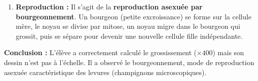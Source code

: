 \documentclass[11pt]{article}
\begin{document}
\begin{exoresolu}
\begin{enumerate}
\begin{enumerate}
                \item Dessiner au \textbf{crayon à papier} (mine HB ou 2H) sur \textbf{papier blanc uni} (pas de quadrillage).
                \item Faire un \textbf{trait continu, fin et net} (pas de hachures, pas de traits de construction visibles, pas de coloriage).
                \item Respecter les \textbf{proportions} des structures observées (forme, taille relative) et ajouter une \textbf{barre d'échelle} ou la mention du grossissement.
            \end{enumerate}
        \item \textbf{Reproduction :} Il s'agit de la \textbf{reproduction asexuée par bourgeonnement}. Un bourgeon (petite excroissance) se forme sur la cellule mère, le noyau se divise par mitose, un noyau migre dans le bourgeon qui grossit, puis se sépare pour devenir une nouvelle cellule fille indépendante.
    \end{enumerate}
    \textbf{Conclusion :} L'élève a correctement calculé le grossissement ($\times 400$) mais son dessin n'est pas à l'échelle. Il a observé le bourgeonnement, mode de reproduction asexuée caractéristique des levures (champignons microscopiques).
\end{exoresolu}
\end{document}
